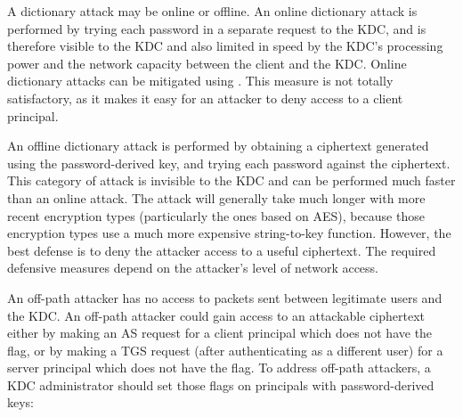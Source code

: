 \documentclass[letterpaper,10pt,english]{sphinxmanual}
\begin{document}
A dictionary attack may be online or offline.  An online dictionary
attack is performed by trying each password in a separate request to
the KDC, and is therefore visible to the KDC and also limited in speed
by the KDC’s processing power and the network capacity between the
client and the KDC.  Online dictionary attacks can be mitigated using
{\hyperref[\detokenize{admin/lockout:lockout}]{}}.  This measure is not totally
satisfactory, as it makes it easy for an attacker to deny access to a
client principal.

An offline dictionary attack is performed by obtaining a ciphertext
generated using the password-derived key, and trying each password
against the ciphertext.  This category of attack is invisible to the
KDC and can be performed much faster than an online attack.  The
attack will generally take much longer with more recent encryption
types (particularly the ones based on AES), because those encryption
types use a much more expensive string-to-key function.  However, the
best defense is to deny the attacker access to a useful ciphertext.
The required defensive measures depend on the attacker’s level of
network access.

An off-path attacker has no access to packets sent between legitimate
users and the KDC.  An off-path attacker could gain access to an
attackable ciphertext either by making an AS request for a client
principal which does not have the  flag, or by
making a TGS request (after authenticating as a different user) for a
server principal which does not have the  flag.  To
address off-path attackers, a KDC administrator should set those flags
on principals with password-derived keys:

%
\begin{sphinxVerbatim}[commandchars=\\\{\}]
    
\end{sphinxVerbatim}
\end{document}
